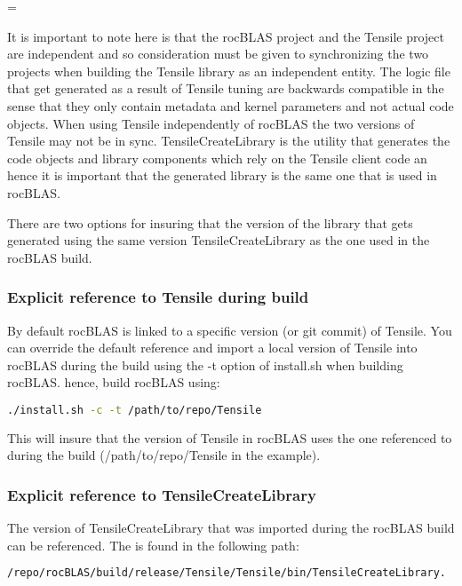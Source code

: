 \documentclass[]{article}
\newenvironment{warning}
{\par\begin{mdframed}[linewidth=2pt,linecolor=red]
		\begin{list}{}{\leftmargin=1cm
				\labelwidth=\leftmargin}\item[\Large\ding{43}]}
		{\end{list}\end{mdframed}\par}
\begin{document}
\begin{warning}
	It is important to note here is that the rocBLAS project and the Tensile project are independent and so consideration must be given to synchronizing the two projects when building the Tensile library as an independent entity. The logic file that get generated as a result of Tensile tuning are backwards compatible in the sense that they only contain metadata and kernel parameters and not actual code objects. When using Tensile independently of rocBLAS the two versions of Tensile may not be in sync. TensileCreateLibrary is the utility that generates the code objects and library components which rely on the Tensile client code an hence it is important that the generated library is the same one that is used in rocBLAS.
\end{warning}

There are two options for insuring that the version of the library that gets generated using the same version TensileCreateLibrary as the one used in the rocBLAS build.

\subsubsection{Explicit reference to Tensile during build}
By default rocBLAS is linked to a specific version (or git commit) of Tensile. You can override the default reference and import a local version of Tensile into rocBLAS during the build using the -t option of install.sh when building rocBLAS. hence, build rocBLAS using:

\begin{lstlisting}[language=bash]
./install.sh -c -t /path/to/repo/Tensile 
\end{lstlisting}

This will insure that the version of Tensile in rocBLAS uses the one referenced to during the build (/path/to/repo/Tensile in the example). 

\subsubsection{Explicit reference to TensileCreateLibrary}

The version of TensileCreateLibrary that was imported during the rocBLAS build can be referenced. The is found in the following path:

\begin{lstlisting}[language=bash]
/repo/rocBLAS/build/release/Tensile/Tensile/bin/TensileCreateLibrary.
\end{lstlisting}
\end{document}
